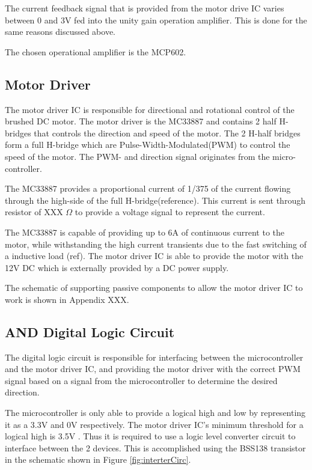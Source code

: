 \documentclass[a4paper,12pt]{article}
\begin{document}
	The current feedback signal that is provided from the motor drive IC varies between 0 and 3V fed into the unity gain operation amplifier. This is done for the same reasons discussed above.
	
	The chosen operational amplifier is the MCP602. 
	
	\subsection{Motor Driver}
	
	The motor driver IC is responsible for directional and rotational control of the brushed DC motor. The motor driver is the MC33887 and contains 2 half H-bridges that controls the direction and speed of the motor. The 2 H-half bridges form a full H-bridge which are Pulse-Width-Modulated(PWM) to control the speed of the motor. The PWM- and direction signal originates from the micro-controller. 
	
	The MC33887 provides a proportional current of 1/375 of the current flowing through the high-side of the full H-bridge(reference). This current is sent through resistor of XXX $\Omega$ to provide a voltage signal to represent the current.
	
	The MC33887 is capable of providing up to 6A of continuous current to the motor, while withstanding the high current transients due to the fast switching of a inductive load (ref). The motor driver IC is able to provide the motor with the 12V DC which is externally provided by a DC power supply.
	
	The schematic of supporting passive components to allow the motor driver IC to work is shown in Appendix XXX.
	
	\subsection{AND Digital Logic Circuit}
	
	The digital logic circuit is responsible for interfacing between the microcontroller and the motor driver IC, and providing the motor driver with the correct PWM signal based on a signal from the microcontroller to determine the desired direction.
	
	The microcontroller is only able to provide a logical high and low by representing it as a 3.3V and 0V respectively. The motor driver IC's minimum threshold for a logical high is 3.5V \cite{motorIC}. Thus it is required to use a logic level converter circuit to interface between the 2 devices. This is accomplished using the BSS138 transistor in the schematic shown in Figure \ref{fig:interterCirc}. 
	
\end{document}
